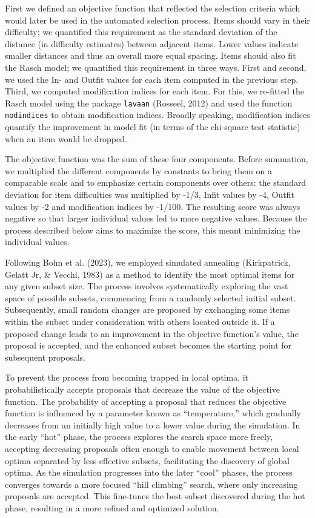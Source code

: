 \documentclass[
  man,floatsintext]{apa6}
\begin{document}
First we defined an objective function that reflected the selection criteria which would later be used in the automated selection process. Items should vary in their difficulty; we quantified this requirement as the standard deviation of the distance (in difficulty estimates) between adjacent items. Lower values indicate smaller distances and thus an overall more equal spacing. Items should also fit the Rasch model; we quantified this requirement in three ways. First and second, we used the In- and Outfit values for each item computed in the previous step. Third, we computed modification indices for each item. For this, we re-fitted the Rasch model using the package \texttt{lavaan} (Rosseel, 2012) and used the function \texttt{modindices} to obtain modification indices. Broadly speaking, modification indices quantify the improvement in model fit (in terms of the chi-square test statistic) when an item would be dropped.

The objective function was the sum of these four components. Before summation, we multiplied the different components by constants to bring them on a comparable scale and to emphasize certain components over others: the standard deviation for item difficulties was multiplied by -1/3, Infit values by -4, Outfit values by -2 and modification indices by -1/100. The resulting score was always negative so that larger individual values led to more negative values. Because the process described below aims to maximize the score, this meant minimizing the individual values.

Following Bohn et al. (2023), we employed simulated annealing (Kirkpatrick, Gelatt Jr, \& Vecchi, 1983) as a method to identify the most optimal items for any given subset size. The process involves systematically exploring the vast space of possible subsets, commencing from a randomly selected initial subset. Subsequently, small random changes are proposed by exchanging some items within the subset under consideration with others located outside it. If a proposed change leads to an improvement in the objective function's value, the proposal is accepted, and the enhanced subset becomes the starting point for subsequent proposals.

To prevent the process from becoming trapped in local optima, it probabilistically accepts proposals that decrease the value of the objective function. The probability of accepting a proposal that reduces the objective function is influenced by a parameter known as ``temperature,'' which gradually decreases from an initially high value to a lower value during the simulation. In the early ``hot'' phase, the process explores the search space more freely, accepting decreasing proposals often enough to enable movement between local optima separated by less effective subsets, facilitating the discovery of global optima. As the simulation progresses into the later ``cool'' phases, the process converges towards a more focused ``hill climbing'' search, where only increasing proposals are accepted. This fine-tunes the best subset discovered during the hot phase, resulting in a more refined and optimized solution.
\end{document}
